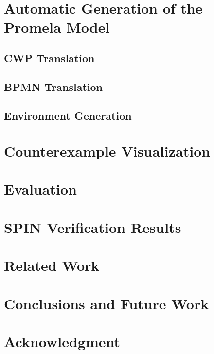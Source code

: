 \documentclass[conference]{IEEEtran}
\begin{document}
\section{Automatic Generation of the Promela Model}
\label{sec:automaticGeneration}


\subsection{CWP Translation}
\label{sec:cwpTranslation}


\subsection{BPMN Translation}
\label{sec:bpmnReasoning}


\subsection{Environment Generation}
\label{sec:envConstruction}



\section{Counterexample Visualization}
\label{sec:counterexample}


\section{Evaluation}
\label{sec:eval}


\section{SPIN Verification Results}
\label{sec:results}


\section{Related Work}


\section{Conclusions and Future Work}


\section*{Acknowledgment}


{\small 
}
\end{document}
